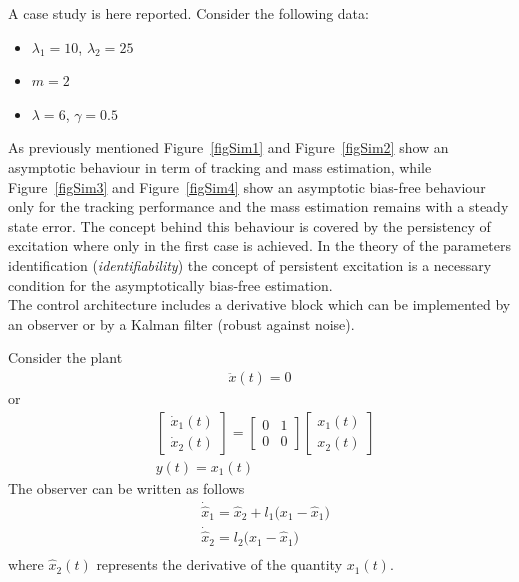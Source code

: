 \documentclass[12pt,a4paper,oneside]{book}
\begin{document}
\begin{onehalfspace}
\begin{example}
	A case study is here reported. Consider the following data:
	\begin{itemize}
		\item $\lambda_1=10$, $\lambda_2=25$
		\item $m=2$
		\item $\lambda=6$, $\gamma=0.5$
	\end{itemize}
	As previously mentioned Figure~\ref{figSim1} and Figure~\ref{figSim2} show an asymptotic behaviour in term of tracking and mass estimation, while Figure~\ref{figSim3} and Figure~\ref{figSim4} show an asymptotic bias-free behaviour only for the tracking performance and the mass estimation remains with a steady state error. The concept behind this behaviour is covered by the persistency of excitation where only in the first case is achieved. In the theory of the parameters identification (\textit{identifiability}) the concept of persistent excitation is a necessary condition for the asymptotically bias-free estimation.\\
	
	The control architecture includes a derivative block which can be implemented by an observer or by a Kalman filter (robust against noise). 
	
	Consider the plant 
	\begin{equation}
		\begin{aligned}
			\ddot{x}(t)=0
		\end{aligned}
	\end{equation}
	or
	\begin{equation}
		\begin{aligned}
			&\begin{bmatrix} \dot{x}_1(t) \\[6pt] \dot{x}_2(t) \end{bmatrix} = \begin{bmatrix} 0&1 \\[6pt] 0&0 \end{bmatrix}\begin{bmatrix} {x}_1(t) \\[6pt] {x}_2(t) \end{bmatrix}\\[6pt]
			&y(t) = x_1(t)
		\end{aligned}
	\end{equation}
	The observer can be written as follows
	\begin{equation}
		\begin{aligned}
			&\dot{\hat{x}}_1 = {\hat{x}}_2 + l_1\big(x_1-\hat{x}_1\big)\\[6pt]
			&\dot{\hat{x}}_2 = l_2\big(x_1-\hat{x}_1\big)\\[6pt]
		\end{aligned}
	\end{equation}
	where $\hat{x}_2(t)$ represents the derivative of the quantity ${x}_1(t)$.
	

\end{example}
\end{onehalfspace}
\end{document}
